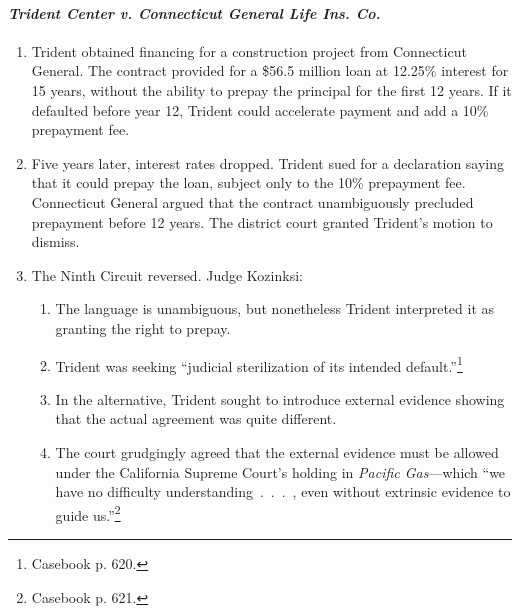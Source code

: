 \paragraph{\emph{Trident Center v. Connecticut General Life Ins. Co.}}

\begin{enumerate}
    \item Trident obtained financing for a construction project from 
    Connecticut General. The contract provided for a \$56.5 million loan at 
    12.25\% interest for 15 years, without the ability to prepay the principal 
    for the first 12 years. If it defaulted before year 12, Trident could 
    accelerate payment and add a 10\% prepayment fee.
    \item Five years later, interest rates dropped. Trident sued for a 
    declaration saying that it could prepay the loan, subject only to the 10\% 
    prepayment fee. Connecticut General argued that the contract unambiguously 
    precluded prepayment before 12 years. The district court granted Trident's 
    motion to dismiss.
    \item The Ninth Circuit reversed. Judge Kozinksi:
    \begin{enumerate}
        \item The language is unambiguous, but nonetheless Trident interpreted 
        it as granting the right to prepay.
        \item Trident was seeking ``judicial sterilization of its intended 
        default.''\footnote{Casebook p. 620.}
        \item In the alternative, Trident sought to introduce external 
        evidence showing that the actual agreement was quite different.
        \item The court grudgingly agreed that the external evidence must be 
        allowed under the California Supreme Court's holding in \emph{Pacific 
        Gas}---which ``we have no difficulty understanding~.~.~.~, even 
        without extrinsic evidence to guide us.''\footnote{Casebook p. 621.}
    \end{enumerate}
\end{enumerate}



